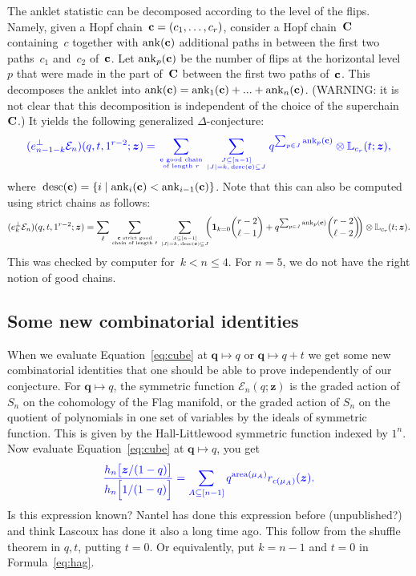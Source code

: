 \documentclass[12pt]{amsart}
\newcommand{\blue}[1]{\textcolor{blue}{#1}}
\newcommand{\green}[1]{\textcolor{green!75!black}{#1}}
\theoremstyle{plain}
\theoremstyle{definition}
\theoremstyle{remark}
\newcommand{\one}{\bm {1}}
\newcommand{\Qvar}{{\bm q}}
\newcommand{\Zvar}{{\bm z}}
\newcommand\area{\mathop{\mathrm{area}}}
\newcommand{\desc}{\mathop{\mathrm{desc}}}
\newcommand{\ank}{\mathop{\mathrm{ank}}}
\newcommand{\set}[2]{\left\{ #1 \;\middle|\; #2 \right\}} %
\begin{document}
The anklet statistic can be decomposed according to the level of the flips.
Namely, given a Hopf chain~${\bf c} = (c_1, \dots, c_r)$, consider a Hopf chain~${\bf C}$ containing~$c$ together with $\ank({\bf c})$ additional paths in between the first two paths~$c_1$ and~$c_2$ of~${\bf c}$.
Let $\ank_p({\bf c})$ be the number of flips at the horizontal level~$p$ that were made in the part of~${\bf C}$ between the first two paths of~${\bf c}$.
This decomposes the anklet into $\ank({\bf c}) = \ank_1({\bf c}) + ... + \ank_n({\bf c})$.
(\green{WARNING: it is not clear that this decomposition is independent of the choice of the superchain~${\bf C}$.})
It yields the following generalized $\Delta$-conjecture:
\[
\blue{
(e_{n-1-k}^\perp {\mathcal E}_n)(q, t, 1^{r-2};\Zvar) = \sum_{{\bf c} \text{ good chain} \atop \text{of length } r} \sum_{J \subseteq [n-1] \atop |J| = k, \, \desc({\bf c}) \subseteq J} q^{\sum_{p \in J} \ank_p({\bf c})} \otimes {\mathbb L}_{c_r}(t;\Zvar),
}
\]
where~$\desc({\bf c}) = \set{i}{\ank_i({\bf c}) < \ank_{i-1}({\bf c})}$.
Note that this can also be computed using strict chains as follows:
\[
(e_k^\perp {\mathcal E}_n)(q, t, 1^{r-2};\Zvar) = \sum_\ell \sum_{{\bf c} \text{ strict good} \atop \text{chain of length } \ell} \sum_{J \subseteq [n-1] \atop |J| = k, \, \desc({\bf c}) \subseteq J} \!\!\!\! \bigg( \one_{k = 0} \binom{r-2}{\ell-1} + q^{\sum_{p \in J} \ank_p({\bf c})} \binom{r-2}{\ell-2} \!\! \bigg) \otimes {\mathbb L}_{c_r}(t;\Zvar).
\]
This was checked by computer for~$k < n \le 4$. For $n = 5$, we do not have the right notion of good chains.

\subsection{Some new combinatorial identities}

When we evaluate Equation~\eqref{eq:cube} at $\Qvar\mapsto q$ or $\Qvar\mapsto q+t$ we get some new combinatorial identities that one should be able to prove independently of our conjecture.
For $\Qvar\mapsto q$, the symmetric function ${\mathcal E}_n(q;\Zvar)$ is the graded action of $S_n$ on the cohomology of the Flag manifold, or the graded action of $S_n$ on the quotient of polynomials in one set of variables by the ideals of symmetric function.
This is given by the Hall-Littlewood symmetric function indexed by $1^n$.
Now evaluate Equation~\eqref{eq:cube} at $\Qvar\mapsto q$, you get
\begin{equation}\label{eq:onevar}
\blue{
\frac{h_n\big[ {\Zvar}/{(1-q)}\big]}{h_n\Big[ {1}/{(1-q)}\Big]} = \sum_{A\subseteq[n-1]} q^{\area(\mu_A)} r_{c(\mu_A)}(\Zvar).
}
\end{equation}
Is this expression known? Nantel has done this expression before (unpublished?) and think Lascoux has done it also a long time ago. 
This follow from  the shuffle theorem in $q,t$, putting $t=0$. Or equivalently, put $k=n-1$ and $t=0$ in Formula~\eqref{eq:hag}.
\end{document}
